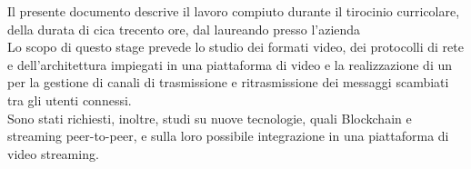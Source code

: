 Il presente documento descrive il lavoro compiuto durante il tirocinio curricolare, della durata di cica trecento ore, dal laureando \myName{} presso l'azienda \nomeAziendaComm{}
\\
Lo scopo di questo stage prevede lo studio dei formati video, dei protocolli di rete e dell'architettura impiegati in una piattaforma di video  e la realizzazione di un  per la gestione di canali di trasmissione e ritrasmissione dei messaggi scambiati tra gli utenti connessi.
\\
Sono stati richiesti, inoltre, studi su nuove tecnologie, quali Blockchain e streaming peer-to-peer, e sulla loro possibile integrazione in una piattaforma di video streaming.